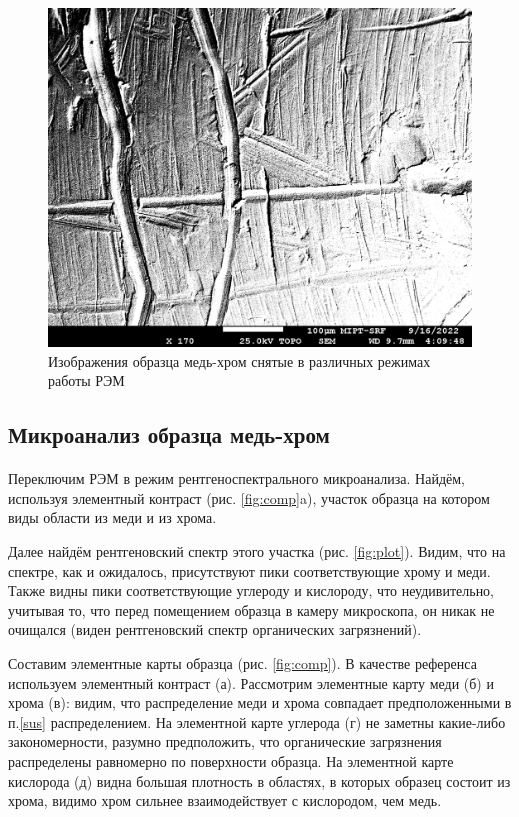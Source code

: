\documentclass[a4paper,12pt]{article} %
\begin{document}
\begin{figure}[h]
\begin{minipage}{0.49\textwidth}
\vspace{0.5em}
\includegraphics[width=\textwidth]{Tablet004.jpg}
\vspace{-2em}
\end{minipage}

\caption{Изображения образца медь-хром снятые в различных режимах работы РЭМ}
\label{fig:tablet}
\end{figure}

\subsection{Микроанализ образца медь-хром}

\paragraph{} Переключим РЭМ в режим рентгеноспектрального микроанализа. Найдём, используя элементный контраст (рис. \ref{fig:comp}a), участок образца на котором виды области из меди и из хрома. 

Далее найдём рентгеновский спектр этого участка (рис. \ref{fig:plot}). Видим, что на спектре, как и ожидалось, присутствуют пики соответствующие хрому и меди. Также видны пики соответствующие углероду и кислороду, что неудивительно, учитывая то, что перед помещением образца в камеру микроскопа, он никак не очищался (виден рентгеновский спектр органических загрязнений). 

Составим элементные карты образца (рис. \ref{fig:comp}). В качестве референса используем элементный контраст (а). Рассмотрим элементные карту меди (б) и хрома (в): видим, что распределение меди и хрома совпадает предположенными в п.\ref{sus} распределением. На элементной карте углерода (г) не заметны какие-либо закономерности, разумно предположить, что органические загрязнения распределены равномерно по поверхности образца. На элементной карте кислорода (д) видна большая плотность в областях, в которых образец состоит из хрома, видимо хром сильнее взаимодействует с кислородом, чем медь.
\end{document}
